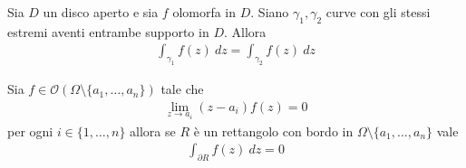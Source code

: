 \begin{corollary}
	Sia $D$ un disco aperto e sia $f$ olomorfa in $D$. Siano $\gamma_1, \gamma_2$ curve con gli stessi estremi aventi entrambe supporto in $D$. Allora
	\begin{equation*}
	\begin{aligned}	
	\int_{\gamma_1} f(z) \ dz = \int_{\gamma_2} f(z) \ dz
	\end{aligned}
	\end{equation*}
\end{corollary}

\begin{theorem}
	\label{thr:goursat-con-singolarità}
	Sia $f \in \mathcal{O}(\Omega \setminus \{a_1, \dots, a_n\})$ tale che
	\begin{equation*}
	\begin{aligned}
	\lim_{z\to a_i} (z-a_i)f(z) = 0
	\end{aligned}
	\end{equation*}
	per ogni $i \in \{1, \dots, n\}$ allora se $R$ è un rettangolo con bordo in $\Omega \setminus  \{a_1, \dots, a_n\}$ vale
	\begin{equation*}
	\begin{aligned}
	\int_{\partial R} f(z)\ dz = 0
	\end{aligned}
	\end{equation*}
\end{theorem}
